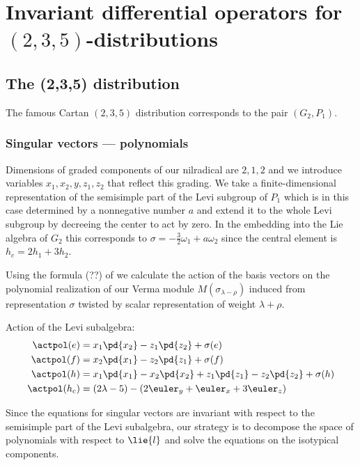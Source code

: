 \chapter{Invariant differential operators for $(2,3,5)$-distributions}

\section{The (2,3,5) distribution}

The famous Cartan $(2,3,5)$ distribution corresponds to the pair $(G_2, P_1)$.

\subsection{Singular vectors --- polynomials}

Dimensions of graded components of our nilradical are $2, 1, 2$ and we introduce variables $x_1, x_2, y, z_1, z_2$ that reflect this grading. We take a finite-dimensional representation of the semisimple part of the Levi subgroup of $P_1$ which is in this case determined by a nonnegative number $a$ and extend it to the whole Levi subgroup by decreeing the center to act by zero. In the embedding into the Lie algebra of $G_2$ this corresponds to $\sigma = -\frac{3}{2} \omega_1 + a \omega_2$ since the central element is $h_c = 2h_1 + 3h_2$.

Using the formula (??) of \cite{ks_2015} we calculate the action of the basis vectors on the polynomial realization of our Verma module $M(\sigma_{\lambda-\rho})$ induced from representation $\sigma$ twisted by scalar representation of weight $\lambda + \rho$.

Action of the Levi subalgebra:
\begin{align}
    \actpol(e) &= x_1 \pd{x_2} - z_1 \pd{z_2} + \sigma(e) \\
    \actpol(f) &= x_2 \pd{x_1} - z_2 \pd{z_1} + \sigma(f)\\
    \actpol(h) &= x_1 \pd{x_1} - x_2 \pd{x_2} + z_1 \pd{z_1} - z_2 \pd{z_2} + \sigma(h) \\
    \actpol(h_c) &= (2\lambda -5) - (2 \euler_y + \euler_x + 3 \euler_z)
\end{align}

Since the equations for singular vectors are invariant with respect to the semisimple part of the Levi subalgebra, our strategy is to decompose the space of polynomials with respect to $\lie{l}$ and solve the equations on the isotypical components.

